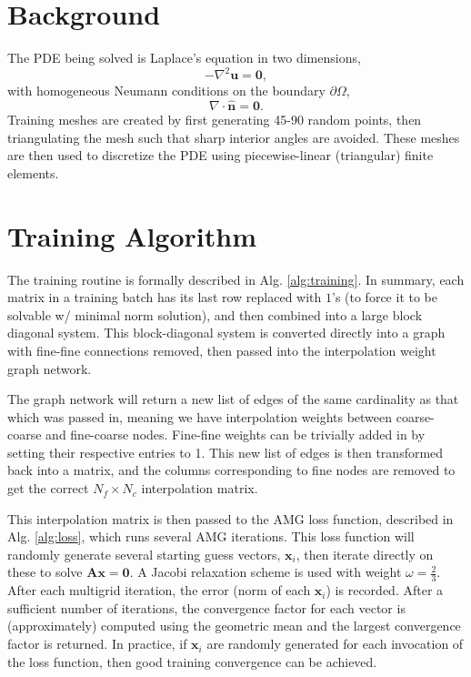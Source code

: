 \documentclass{article}
\newcommand{\mat}[1]{\bm{{#1}}}
\renewcommand{\vec}[1]{\bm{{#1}}}
\newcommand{\grad}{\nabla}
\begin{document}
\section{Background}
The PDE being solved is Laplace's equation in two dimensions,
\begin{equation}
  -\grad^2 \vec{u} = \vec{0},
\end{equation}
with homogeneous Neumann conditions on the boundary $\partial \Omega$,
\begin{equation}
  \grad \cdot \vec{\hat{n}} = \vec{0}.
\end{equation}
Training meshes are created by first generating 45-90 random points, then triangulating the mesh such that sharp interior angles are avoided.
These meshes are then used to discretize the PDE using piecewise-linear (triangular) finite elements.

\section{Training Algorithm}

The training routine is formally described in Alg. \ref{alg:training}.  In summary, each matrix in a training batch has its last row replaced with $1$'s (to force it to be solvable w/ minimal norm solution), and then combined into a large block diagonal system.  This block-diagonal system is converted directly into a graph with fine-fine connections removed, then passed into the interpolation weight graph network.

The graph network will return a new list of edges of the same cardinality as that which was passed in, meaning we have interpolation weights between coarse-coarse and fine-coarse nodes.  Fine-fine weights can be trivially added in by setting their respective entries to 1.  This new list of edges is then transformed back into a matrix, and the columns corresponding to fine nodes are removed to get the correct $N_f \times N_c$ interpolation matrix.

This interpolation matrix is then passed to the AMG loss function, described in Alg. \ref{alg:loss}, which runs several AMG iterations.  This loss function will randomly generate several starting guess vectors, $\vec{x}_i$, then iterate directly on these to solve $\mat{Ax}=\mat{0}$.  A Jacobi relaxation scheme is used with weight $\omega=\frac{2}{3}$.  After each multigrid iteration, the error (norm of each $\vec{x}_i$) is recorded.  After a sufficient number of iterations, the convergence factor for each vector is (approximately) computed using the geometric mean and the largest convergence factor is returned.  In practice, if $\vec{x}_i$ are randomly generated for each invocation of the loss function, then good training convergence can be achieved.
\end{document}
